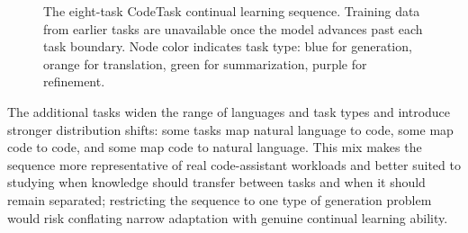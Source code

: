 \begin{figure}[t]
\centering
{}
\caption{The eight-task CodeTask continual learning sequence. Training data from earlier tasks are unavailable once the model advances past each task boundary. Node color indicates task type: blue for generation, orange for translation, green for summarization, purple for refinement.}
\label{fig:codetask_sequence}
\end{figure}

The additional tasks widen the range of languages and task types and introduce stronger distribution shifts: some tasks map natural language to code, some map code to code, and some map code to natural language. This mix makes the sequence more representative of real code-assistant workloads and better suited to studying when knowledge should transfer between tasks and when it should remain separated; restricting the sequence to one type of generation problem would risk conflating narrow adaptation with genuine continual learning ability.

